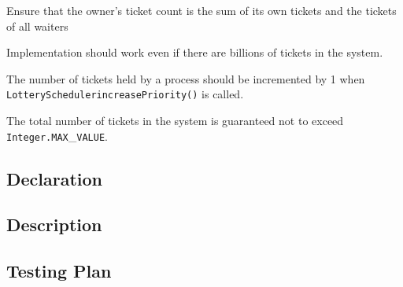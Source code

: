 \documentclass{article}
\begin{document}
\begin{spacing}{1.1}
\begin{asparaitem}
\item Ensure that the owner's ticket count is the sum of its own tickets and the tickets of all waiters
\item Implementation should work even if there are billions of tickets in the system.
\item The number of tickets held by a process should be incremented by 1 when \texttt{LotterySchedulerincreasePriority()} is called.
\item The total number of tickets in the system is guaranteed not to exceed \texttt{Integer.MAX}\_\texttt{VALUE}.
\end{asparaitem}

\subsection{Declaration}

\subsection{Description}

\subsection{Testing Plan}


\end{spacing}
\end{document}
